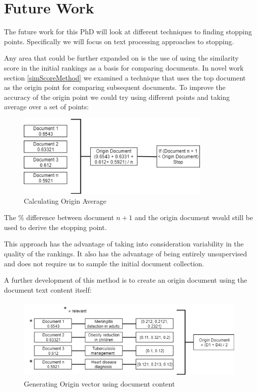 \chapter{Future Work} \label{fw}

The future work for this PhD will look at different techniques to finding stopping points. Specifically we will focus on text processing approaches to stopping.



Any area that could be further expanded on is the use of using the similarity score in the initial rankings as a basis for comparing documents. In novel work section \ref{simScoreMethod} we examined a technique that uses the top document as the origin point for comparing subsequent documents. To improve the accuracy of the origin point we could try using different points and taking average over a set of points:


\begin{figure}[H]
\center
\includegraphics[height=4cm]{figures/originMethod.png}
\caption{Calculating Origin Average}
\end{figure}

The \% difference between document $n+1$ and the origin document would still be used to derive the stopping point.

This approach has the advantage of taking into consideration variability in the quality of the rankings. It also has the advantage of being entirely unsupervised and does not require us to sample the initial document collection. 

A further development of this method is to create an origin document using the document text content itself:

\begin{figure}[H]
\center
\includegraphics[height=4cm]{figures/origin2.png}
\caption{Generating Origin vector using document content}
\end{figure}

